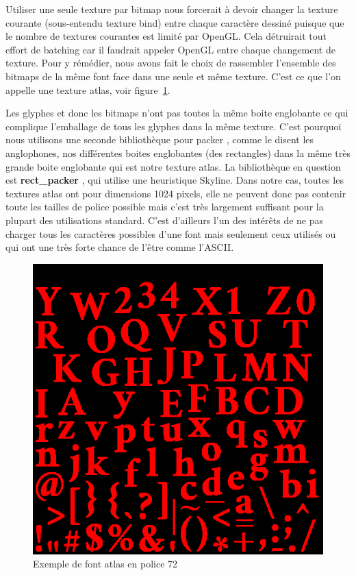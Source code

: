 \documentclass[12pt]{article}
\begin{document}
Utiliser une seule texture par bitmap nous forcerait à devoir changer la texture courante (sous-entendu texture bind) entre chaque caractère dessiné puisque que le nombre de textures
courantes est limité par OpenGL. Cela détruirait tout effort de batching car il faudrait appeler OpenGL entre chaque changement de texture.
Pour y rémédier, nous avons fait le choix de rassembler l'ensemble des bitmaps de la même font face dans une seule et même texture.
C'est ce que l'on appelle une texture atlas, voir figure~\ref{fig:atlas}.

Les glyphes et donc les bitmaps n'ont pas toutes la même boite englobante ce qui complique l'emballage de tous les glyphes dans la même texture.
C'est pourquoi nous utilisons une seconde bibliothèque pour \og packer \fg{}, comme le disent les anglophones, nos différentes boites englobantes (des rectangles) dans la même très grande boite
englobante qui est notre texture atlas. La bibliothèque en question est \textbf{rect\_packer} \cite{rect-packer}, qui utilise une heuristique Skyline. Dans notre cas, toutes les textures atlas
ont pour dimensions 1024 pixels, elle ne peuvent donc pas contenir toute les tailles de police possible mais c'est très largement suffisant pour la plupart des utilisations standard.
C'est d'ailleurs l'un des intérêts de ne pas charger tous les caractères possibles d'une font mais seulement ceux utilisés ou qui ont une très forte chance de l'être comme l'ASCII.

\begin{figure}[htp]
  \centering
  \includegraphics[scale=0.8]{images/font-atlas}
  \caption{Exemple de font atlas en police 72}
  \label{fig:atlas}
\end{figure}
\end{document}
